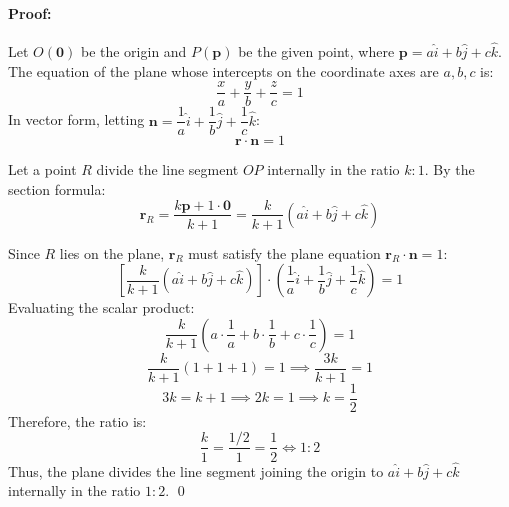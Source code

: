 \documentclass[11pt,a4paper]{article}
\begin{document}
\paragraph{Proof:}
Let $O(\mathbf{0})$ be the origin and $P(\mathbf{p})$ be the given point, where $\mathbf{p} = a\hat{i} + b\hat{j} + c\hat{k}$.\\
The equation of the plane whose intercepts on the coordinate axes are $a, b, c$ is:
$$\frac{x}{a} + \frac{y}{b} + \frac{z}{c} = 1$$
In vector form, letting $\mathbf{n} = \dfrac{1}{a}\hat{i} + \dfrac{1}{b}\hat{j} + \dfrac{1}{c}\hat{k}$:
$$\mathbf{r} \cdot \mathbf{n} = 1$$

Let a point $R$ divide the line segment $OP$ internally in the ratio $k : 1$. By the section formula:
$$\mathbf{r}_R = \frac{k\mathbf{p} + 1\cdot\mathbf{0}}{k + 1} = \frac{k}{k + 1}(a\hat{i} + b\hat{j} + c\hat{k})$$

Since $R$ lies on the plane, $\mathbf{r}_R$ must satisfy the plane equation $\mathbf{r}_R \cdot \mathbf{n} = 1$:
$$\left[\frac{k}{k + 1}(a\hat{i} + b\hat{j} + c\hat{k})\right] \cdot \left(\frac{1}{a}\hat{i} + \frac{1}{b}\hat{j} + \frac{1}{c}\hat{k}\right) = 1$$
Evaluating the scalar product:
$$\frac{k}{k + 1}\left(a \cdot \frac{1}{a} + b \cdot \frac{1}{b} + c \cdot \frac{1}{c}\right) = 1$$
$$\frac{k}{k + 1}(1 + 1 + 1) = 1 \implies \frac{3k}{k + 1} = 1$$
$$3k = k + 1 \implies 2k = 1 \implies k = \frac{1}{2}$$
Therefore, the ratio is:
$$\frac{k}{1} = \frac{1/2}{1} = \frac{1}{2} \iff 1 : 2$$
Thus, the plane divides the line segment joining the origin to $a\hat{i} + b\hat{j} + c\hat{k}$ internally in the ratio $1 : 2$. \qed
\begin{center}
\end{center}
\end{document}
